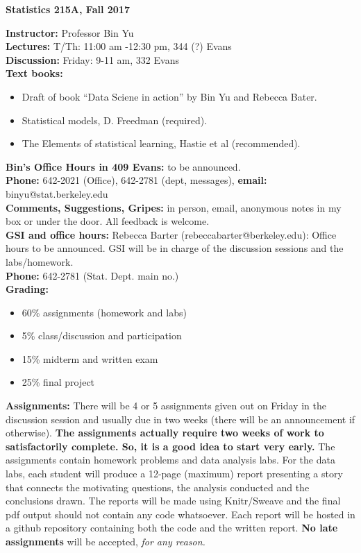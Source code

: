 \documentclass[11pt]{article}
\begin{document}
\begin{center}
{\large \bf Statistics 215A, Fall 2017}
\end{center}
{\bf Instructor:} Professor Bin Yu\\
{\bf Lectures:} T/Th: 11:00 am -12:30 pm,  344 (?) Evans \\
{\bf Discussion:} Friday: 9-11 am,  332 Evans\\

\noindent
{\bf Text books:}
\begin{itemize}
\item Draft of book ``Data Sciene in action'' by Bin Yu and Rebecca Bater.
\item Statistical models, D. Freedman (required).
\item The Elements of statistical learning, Hastie et al (recommended).
\end{itemize}


\noindent
{\bf Bin's Office Hours in 409 Evans:}  to be announced. 
\\[1ex]
{\bf Phone:} 642-2021 (Office), 642-2781 (dept, messages),
{\bf email:} binyu@stat.berkeley.edu \\[1ex]
{\bf Comments, Suggestions, Gripes:} in person, email, 
anonymous notes in my box or under the door.  All feedback is
welcome.\\[2ex]
{\bf GSI and office hours:}  
Rebecca Barter (rebeccabarter@berkeley.edu): Office hours to be announced.
GSI will be in charge of the discussion sessions and the labs/homework.
\\[1ex]
{\bf Phone:} 
642-2781 (Stat. Dept. main no.)
\\[1ex]
{\bf Grading:}
\begin{itemize}
\item 60\% assignments (homework and labs)
\item  5\% class/discussion and participation
\item 15\% midterm and written exam 
\item 25\% final project
\end{itemize}
{\bf Assignments:}
There will be 4 or 5 assignments given out on Friday in the discussion session and usually
due in two weeks (there will be an announcement if otherwise). {\bf The assignments
actually require two weeks of work to satisfactorily complete. So, it is a good idea to start very early.} The assignments contain homework problems and data analysis labs. 
For the data labs, each student will produce a 12-page (maximum) report presenting a story that connects the motivating questions, the analysis conducted and the conclusions drawn. The reports will be made using Knitr/Sweave and the final pdf output should not contain any code whatsoever. Each report will be hosted in a github repository containing both the code and the written report.  {\bf No late assignments} will be accepted, {\em for any reason.} \\
\end{document}
